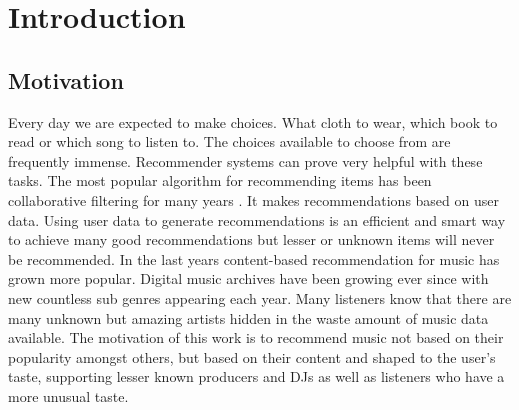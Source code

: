 \documentclass[cic,tc,english]{iiufrgs}
\begin{document}

\tableofcontents


\chapter{Introduction}



\section{Motivation}
Every day we are expected to make choices. What cloth to wear, which book to read or which song to listen to. The choices available to choose from are frequently immense. Recommender systems can prove very helpful with these tasks. The most popular algorithm for recommending items has been collaborative filtering for many years \cite{uitdenbogerd2002review}. It makes recommendations based on user data. Using user data to generate recommendations is an efficient and smart way to achieve many good recommendations but lesser or unknown items will never be recommended. In the last years content-based recommendation for music has grown more popular. Digital music archives have been growing ever since with new countless sub genres appearing each year. Many listeners know that there are many unknown but amazing artists hidden in the waste amount of music data available. The motivation of this work is to recommend music not based on their popularity amongst others, but based on their content and shaped to the user's taste, supporting lesser known producers and DJs as well as listeners who have a more unusual taste.
\end{document}
